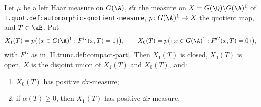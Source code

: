 Let $\mu$ be a left Haar measure on $G(\A)$, $\dd\dot x$ the measure on $X=G(\Q)\backslash G(\A)^1$ of
\texttt{I.quot.def:automorphic-quotient-measure}, $p\colon G(\A)^1\to X$ the quotient map, and $T\in\aB$. Put
\[
  X_1(T)=p\bigl(\{x\in G(\A)^1:F^G(x,T)=1\}\bigr),\qquad X_0(T)=p\bigl(\{x\in G(\A)^1:F^G(x,T)=0\}\bigr),
\]
with $F^G$ as in \cref{II.trunc.def:compact-part}. Then $X_1(T)$ is closed, $X_0(T)$ is open, $X$ is the disjoint union of $X_1(T)$ and $X_0(T)$, and:
\begin{enumerate}
  \item[(a)] $X_0(T)$ has positive $\dd\dot x$-measure;
  \item[(b)] if $\alpha(T)\ge0$, then $X_1(T)$ has positive $\dd\dot x$-measure.
\end{enumerate}
